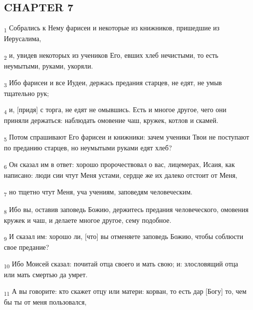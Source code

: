 \subsection{CHAPTER 7}
\begin{tcolorbox}
\textsubscript{1} Собрались к Нему фарисеи и некоторые из книжников, пришедшие из Иерусалима,
\end{tcolorbox}
\begin{tcolorbox}
\textsubscript{2} и, увидев некоторых из учеников Его, евших хлеб нечистыми, то есть неумытыми, руками, укоряли.
\end{tcolorbox}
\begin{tcolorbox}
\textsubscript{3} Ибо фарисеи и все Иудеи, держась предания старцев, не едят, не умыв тщательно рук;
\end{tcolorbox}
\begin{tcolorbox}
\textsubscript{4} и, [придя] с торга, не едят не омывшись. Есть и многое другое, чего они приняли держаться: наблюдать омовение чаш, кружек, котлов и скамей.
\end{tcolorbox}
\begin{tcolorbox}
\textsubscript{5} Потом спрашивают Его фарисеи и книжники: зачем ученики Твои не поступают по преданию старцев, но неумытыми руками едят хлеб?
\end{tcolorbox}
\begin{tcolorbox}
\textsubscript{6} Он сказал им в ответ: хорошо пророчествовал о вас, лицемерах, Исаия, как написано: люди сии чтут Меня устами, сердце же их далеко отстоит от Меня,
\end{tcolorbox}
\begin{tcolorbox}
\textsubscript{7} но тщетно чтут Меня, уча учениям, заповедям человеческим.
\end{tcolorbox}
\begin{tcolorbox}
\textsubscript{8} Ибо вы, оставив заповедь Божию, держитесь предания человеческого, омовения кружек и чаш, и делаете многое другое, сему подобное.
\end{tcolorbox}
\begin{tcolorbox}
\textsubscript{9} И сказал им: хорошо ли, [что] вы отменяете заповедь Божию, чтобы соблюсти свое предание?
\end{tcolorbox}
\begin{tcolorbox}
\textsubscript{10} Ибо Моисей сказал: почитай отца своего и мать свою; и: злословящий отца или мать смертью да умрет.
\end{tcolorbox}
\begin{tcolorbox}
\textsubscript{11} А вы говорите: кто скажет отцу или матери: корван, то есть дар [Богу] то, чем бы ты от меня пользовался,
\end{tcolorbox}
